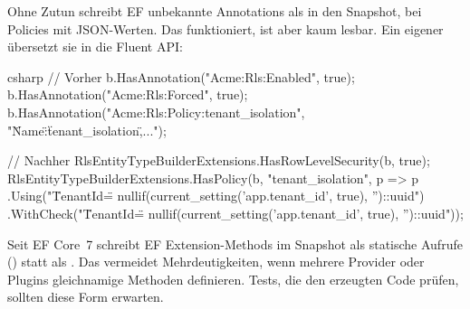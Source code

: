 Ohne Zutun schreibt EF unbekannte Annotations als
in den Snapshot, bei Policies mit JSON-Werten. Das funktioniert, ist aber kaum lesbar. Ein
eigener  übersetzt sie in die
Fluent API:

\begin{sourcecode}{csharp}
// Vorher
b.HasAnnotation("Acme:Rls:Enabled", true);
b.HasAnnotation("Acme:Rls:Forced", true);
b.HasAnnotation("Acme:Rls:Policy:tenant_isolation", "{\"Name\":\"tenant_isolation\",...}");

// Nachher
RlsEntityTypeBuilderExtensions.HasRowLevelSecurity(b, true);
RlsEntityTypeBuilderExtensions.HasPolicy(b, "tenant_isolation", p => p
    .Using("\"TenantId\" = nullif(current_setting('app.tenant_id', true), '')::uuid")
    .WithCheck("\"TenantId\" = nullif(current_setting('app.tenant_id', true), '')::uuid"));
\end{sourcecode}

Seit EF Core~7 schreibt EF Extension-Methods im Snapshot als statische Aufrufe
() statt als
. Das
vermeidet Mehrdeutigkeiten, wenn mehrere Provider oder Plugins gleichnamige Methoden
definieren. Tests, die den erzeugten Code prüfen, sollten diese Form erwarten.

